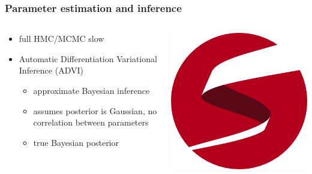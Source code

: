 \documentclass{beamer}
\begin{document}
\begin{frame}
  \frametitle{Parameter estimation and inference}
  \begin{columns}
    \begin{column}{0.45\textwidth}
      \begin{itemize}
        \item full HMC/MCMC slow
        \item Automatic Differentiation Variational Inference (ADVI) 
          \begin{itemize}
            \item approximate Bayesian inference
            \item assumes posterior is Gaussian, no correlation between parameters
            \item true Bayesian posterior
          \end{itemize}
      \end{itemize}
    \end{column}
    \begin{column}{0.55\textwidth}
      \includegraphics[height=0.9\textheight,width=\textwidth,keepaspectratio=true]{figure/stan_logo}
    \end{column}
  \end{columns}
\end{frame}
\end{document}
